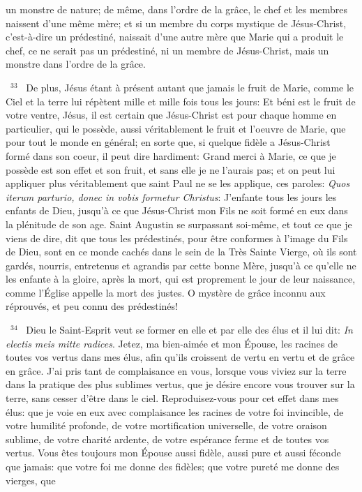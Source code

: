 \documentclass[paper=a5,pagesize=pdftex,fontsize=15pt,headinclude=on,twoside=off]{scrbook}
\newcommand{\negphantom}[1]{\settowidth{\dimen0}{#1}\hspace*{-\dimen0}}
\newcommand{\versenb}[1]{\par \vspace{10pt}~\negphantom{~${}^{#1}$~}${}^{#1}$~}
\newcommand{\latin}[1]{\emph{#1}}
\begin{document}
un monstre de nature; de même, dans l'ordre de la grâce, le chef et les membres naissent d'une même mère; et si
un membre du corps mystique de Jésus-Christ, c'est-à-dire un prédestiné, naissait d'une autre mère que Marie qui
a produit le chef, ce ne serait pas un prédestiné, ni un membre de Jésus-Christ, mais un monstre dans l'ordre de la
grâce.
\versenb{33} De plus, Jésus étant à présent autant que jamais le fruit de Marie, comme le Ciel et la terre lui répètent mille et
mille fois tous les jours: Et béni est le fruit de votre ventre, Jésus, il est certain que Jésus-Christ est pour chaque
homme en particulier, qui le possède, aussi véritablement le fruit et l'oeuvre de Marie, que pour tout le monde en
général; en sorte que, si quelque fidèle a Jésus-Christ formé dans son coeur, il peut dire hardiment: Grand merci à
Marie, ce que je possède est son effet et son fruit, et sans elle je ne l'aurais pas; et on peut lui appliquer plus
véritablement que saint Paul ne se les applique, ces paroles: \latin{Quos iterum parturio, donec in vobis formetur
Christus}: J'enfante tous les jours les enfants de Dieu, jusqu'à ce que Jésus-Christ mon Fils ne soit formé en eux
dans la plénitude de son age. Saint Augustin se surpassant soi-même, et tout ce que je viens de dire, dit que tous
les prédestinés, pour être conformes à l'image du Fils de Dieu, sont en ce monde cachés dans le sein de la Très
Sainte Vierge, où ils sont gardés, nourris, entretenus et agrandis par cette bonne Mère, jusqu'à ce qu'elle ne les
enfante à la gloire, après la mort, qui est proprement le jour de leur naissance, comme l'Église appelle la mort des
justes. O mystère de grâce inconnu aux réprouvés, et peu connu des prédestinés!
\versenb{34} Dieu le Saint-Esprit veut se former en elle et par elle des élus et il lui dit: \latin{In electis meis mitte radices}. Jetez,
ma bien-aimée et mon Épouse, les racines de toutes vos vertus dans mes élus, afin qu'ils croissent de vertu en
vertu et de grâce en grâce. J'ai pris tant de complaisance en vous, lorsque vous viviez sur la terre dans la pratique
des plus sublimes vertus, que je désire encore vous trouver sur la terre, sans cesser d'être dans le ciel.
Reproduisez-vous pour cet effet dans mes élus: que je voie en eux avec complaisance les racines de votre foi
invincible, de votre humilité profonde, de votre mortification universelle, de votre oraison sublime, de votre charité
ardente, de votre espérance ferme et de toutes vos vertus. Vous êtes toujours mon Épouse aussi fidèle, aussi pure
et aussi féconde que jamais: que votre foi me donne des fidèles; que votre pureté me donne des vierges, que
\end{document}
